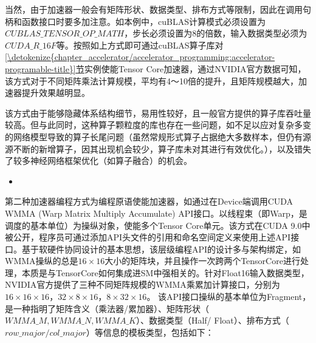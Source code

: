\documentclass[letterpaper,10pt,english]{sphinxmanual}
\begin{document}
\sphinxAtStartPar
当然，由于加速器一般会有矩阵形状、数据类型、排布方式等限制，因此在调用句柄和函数接口时要多加注意。如本例中，cuBLAS计算模式必须设置为\(CUBLAS\_TENSOR\_OP\_MATH\)，步长必须设置为8的倍数，输入数据类型必须为\(CUDA\_R\_16F\)等。按照如上方式即可通过cuBLAS算子库对
\hyperref[\detokenize{chapter_accelerator/accelerator_programming:accelerator-programable-title}]{\ref{\detokenize{chapter_accelerator/accelerator_programming:accelerator-programable-title}}节}实例使能Tensor
Core加速器，通过NVIDIA官方数据可知，该方式对于不同矩阵乘法计算规模，平均有4～10倍的提升，且矩阵规模越大，加速器提升效果越明显。

\sphinxAtStartPar
该方式由于能够隐藏体系结构细节，易用性较好，且一般官方提供的算子库吞吐量较高。但与此同时，这种算子颗粒度的库也存在一些问题，如不足以应对复杂多变的网络模型导致的算子长尾问题（虽然常规形式算子占据绝大多数样本，但仍有源源不断的新增算子，因其出现机会较少，算子库未对其进行有效优化。），以及错失了较多神经网络框架优化（如算子融合）的机会。
\begin{itemize}
\item {} 
\sphinxAtStartPar
{}

\end{itemize}

\sphinxAtStartPar
第二种加速器编程方式为编程原语使能加速器，如通过在Device端调用CUDA WMMA
(Warp Matrix Multiply Accumulate)
API接口。以线程束（即Warp，是调度的基本单位）为操纵对象，使能多个Tensor
Core单元。该方式在CUDA
9.0中被公开，程序员可通过添加API头文件的引用和命名空间定义来使用上述API接口。基于软硬件协同设计的基本思想，该层级编程API的设计多与架构绑定，如WMMA操纵的总是\(16\times16\)大小的矩阵块，并且操作一次跨两个TensorCore进行处理，本质是与TensorCore如何集成进SM中强相关的。针对Float16输入数据类型，NVIDIA官方提供了三种不同矩阵规模的WMMA乘累加计算接口，分别为\(16\times16\times16\)，\(32\times8\times16\)，\(8\times32\times16\)。
该API接口操纵的基本单位为Fragment，是一种指明了矩阵含义（乘法器/累加器）、矩阵形状（\(WMMA\_M, WMMA\_N, WMMA\_K\)）、数据类型（Half/
Float）、排布方式（\(row\_major/ col\_major\)）等信息的模板类型，包括如下：
\end{document}
